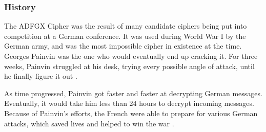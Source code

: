 \documentclass[14pt]{article}
\begin{document}
    	\subsubsection{History}
    	The ADFGX Cipher was the result of many candidate ciphers being put into competition at a German conference. It was used during World War I by the German army, and was the most impossible cipher in existence at the time. Georges Painvin was the one who would eventually end up cracking it. For three weeks, Painvin struggled at his desk, trying every possible angle of attack, until he finally figure it out \cite{Kahn}. 
        
        As time progressed, Painvin got faster and faster at decrypting German messages. Eventually, it would take him less than 24 hours to decrypt incoming messages. Because of Painvin's efforts, the French were able to prepare for various German attacks, which saved lives and helped to win the war \cite{Kahn}.
\end{document}
